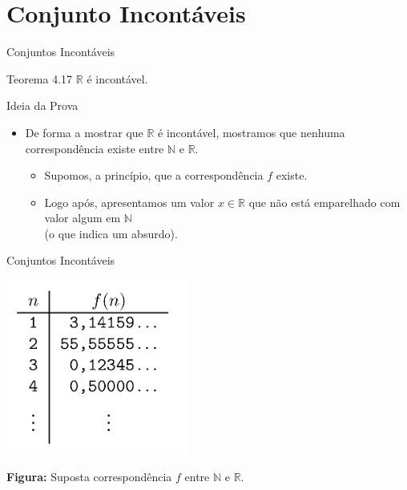\documentclass[xcolor=dvipsnames,table]{beamer}
\begin{document}
	\section{Conjunto Incontáveis}
	
	\begin{frame}{Conjuntos Incontáveis}
		\begin{block}{Teorema 4.17}
			$\mathbb{R}$ é incontável.
		\end{block} \pause
		\begin{block}{Ideia da Prova}
			\begin{itemize}
				\item De forma a mostrar que $\mathbb{R}$ é incontável, mostramos que nenhuma correspondência existe entre $\mathbb{N}$ e $\mathbb{R}$.
				\begin{itemize}
					\item Supomos, a princípio, que a correspondência $f$ existe.
					\item Logo após, apresentamos um valor $x \in \mathbb{R}$ que não está emparelhado com valor algum em $\mathbb{N}$ \\(o que indica um absurdo).				
				\end{itemize}
			\end{itemize}
		\end{block}
	\end{frame}
	
	\begin{frame}{Conjuntos Incontáveis}
		\begin{center}
			\includegraphics[width=6cm]{images/fHip.png}
			
			{\bf Figura:} Suposta correspondência $f$ entre $\mathbb{N}$ e $\mathbb{R}$.
		\end{center}
	\end{frame}
	
\end{document}
